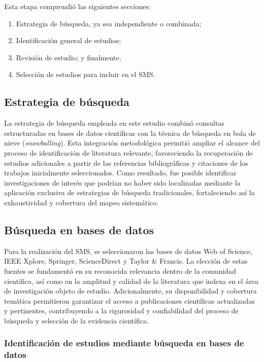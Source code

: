 Esta etapa comprendió las siguientes secciones:
\begin{enumerate}
	\item Estrategia de búsqueda, ya sea independiente o combinada;
	\item Identificación general de estudios;
	\item Revisión de estudio; y finalmente,
	\item Selección de estudios para incluir en el \ac{SMS}.
\end{enumerate}


\subsection{Estrategia de búsqueda}

La estrategia de búsqueda empleada en este estudio combinó consultas estructuradas en bases de datos científicas con la técnica de búsqueda en bola de nieve (\textit{snowballing}). Esta integración metodológica permitió ampliar el alcance del proceso de identificación de literatura relevante, favoreciendo la recuperación de estudios adicionales a partir de las referencias bibliográficas y citaciones de los trabajos inicialmente seleccionados. Como resultado, fue posible identificar investigaciones de interés que podrían no haber sido localizadas mediante la aplicación exclusiva de estrategias de búsqueda tradicionales, fortaleciendo así la exhaustividad y cobertura del mapeo sistemático.


\subsection{Búsqueda en bases de datos}\label{subsec:busqueda-bases-datos}

Para la realización del \ac{SMS}, se seleccionaron las bases de datos Web of Science, IEEE Xplore, Springer, ScienceDirect y Taylor \& Francis. La elección de estas fuentes se fundamentó en su reconocida relevancia dentro de la comunidad científica, así como en la amplitud y calidad de la literatura que indexa en el área de investigación objeto de estudio. Adicionalmente, su disponibilidad y cobertura temática permitieron garantizar el acceso a publicaciones científicas actualizadas y pertinentes, contribuyendo a la rigurosidad y confiabilidad del proceso de búsqueda y selección de la evidencia científica.


\subsubsection{Identificación de estudios mediante búsqueda en bases de datos}\label{subsubsec:identificacion-estudios}

